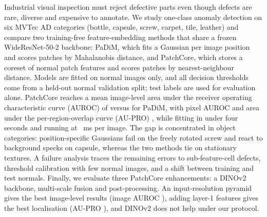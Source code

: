 Industrial visual inspection must reject defective parts even though defects are rare, diverse and expensive to annotate.
We study one-class anomaly detection on six MVTec AD categories (bottle, capsule, screw, carpet, tile, leather) and compare two training-free feature-embedding methods that share a frozen WideResNet-50-2 backbone: PaDiM, which fits a Gaussian per image position and scores patches by Mahalanobis distance, and PatchCore, which stores a coreset of normal patch features and scores patches by nearest-neighbour distance.
Models are fitted on normal images only, and all decision thresholds come from a held-out normal validation split; test labels are used for evaluation alone.
PatchCore reaches a mean image-level area under the receiver operating characteristic curve (AUROC) of \pcImgAurocAll{} versus \pdImgAurocAll{} for PaDiM, with pixel AUROC \pcPixAurocAll{} and area under the per-region-overlap curve (AU-PRO) \pcAuproAll{}, while fitting in under four seconds and running at \pcInferAll{}~ms per image.
The gap is concentrated in object categories: position-specific Gaussians fail on the freely rotated screw and react to background specks on capsule, whereas the two methods tie on stationary textures.
A failure analysis traces the remaining errors to sub-feature-cell defects, threshold calibration with few normal images, and a shift between training and test normals.
Finally, we evaluate three PatchCore enhancements: a DINOv2 backbone, multi-scale fusion and post-processing.
An input-resolution pyramid gives the best image-level results (image AUROC \bnPyrMeanImgAuroc{}), adding layer-1 features gives the best localisation (AU-PRO \bnMsLOneTwoThreeAupro{}), and DINOv2 does not help under our protocol.
